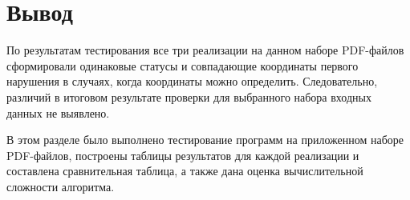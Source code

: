 \section{Вывод}

По результатам тестирования все три реализации на данном наборе PDF-файлов сформировали одинаковые статусы
и совпадающие координаты первого нарушения в случаях, когда координаты можно определить.
Следовательно, различий в итоговом результате проверки для выбранного набора входных данных не выявлено.

В этом разделе было выполнено тестирование программ на приложенном наборе PDF-файлов,
построены таблицы результатов для каждой реализации и составлена сравнительная таблица,
а также дана оценка вычислительной сложности алгоритма.
